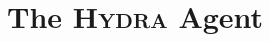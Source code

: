 \documentclass[letterpaper]{article} %
\newcommand{\sbirds}{Science Birds\xspace} %
\newcommand{\hydra}{\textsc{Hydra}\xspace} %
\begin{document}






\section{The \hydra Agent}

\end{document}

